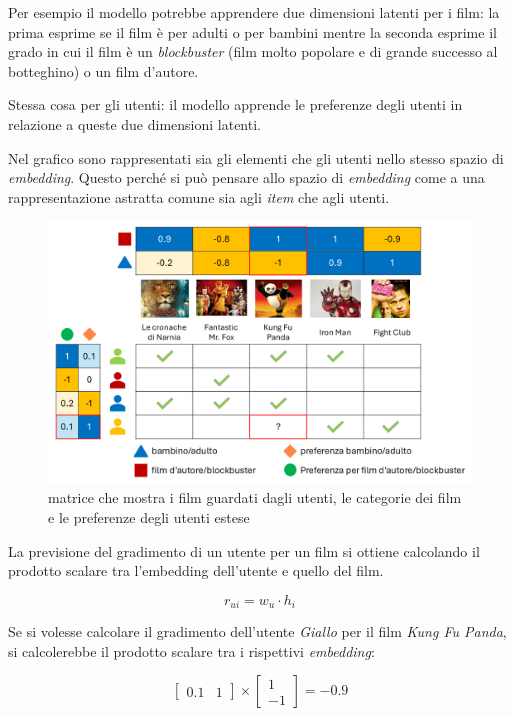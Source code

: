 Per esempio il modello potrebbe apprendere due dimensioni latenti per i film: la prima esprime se il film è per adulti o per bambini mentre la seconda esprime il grado in cui il film è un \textit{blockbuster} (film molto popolare e di grande successo al botteghino) o un film d'autore. 

Stessa cosa per gli utenti: il modello apprende le preferenze degli utenti in relazione a queste due dimensioni latenti.

Nel grafico sono rappresentati sia gli elementi che gli utenti nello stesso spazio di \textit{embedding}. Questo perché si può pensare allo spazio di \textit{embedding} come a una rappresentazione astratta comune sia agli \textit{item} che agli utenti.

\begin{figure}[H]
    \centering
    \includegraphics[scale=0.4]{figures/collaborative_filtering/2D_matrix.PNG}
    \caption{matrice che mostra i film guardati dagli utenti, le categorie dei film e le preferenze degli utenti estese}
    \label{fig:2D_matrix}
\end{figure}


La previsione del gradimento di un utente per un film si ottiene calcolando il prodotto scalare tra l'embedding dell'utente e quello del film.

\[
r_{ui} = w_u \cdot h_i
\]

Se si volesse calcolare il gradimento dell'utente \textit{Giallo} per il film \textit{Kung Fu Panda}, si calcolerebbe il prodotto scalare tra i rispettivi \textit{embedding}:

\[
\begin{bmatrix}
0.1 & 1
\end{bmatrix}
\times
\begin{bmatrix}
1 \\
-1
\end{bmatrix} = -0.9
\]

